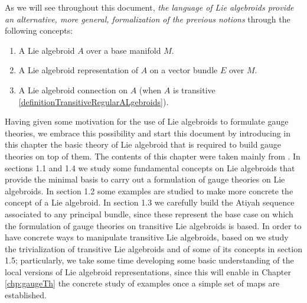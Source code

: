 As we will see throughout this document, \textit{the language of Lie algebroids provide an alternative, more general, formalization of the previous notions} through the following concepts:
\begin{enumerate}
    \item A Lie algebroid $A$ over a base manifold $M$.
    
    \item A Lie algebroid representation of $A$ on a vector bundle $E$ over $M$.
    
    \item A Lie algebroid connection on $A$ (when $A$ is transitive \ref{definitionTransitiveRegularALgebroids}).
\end{enumerate}

Having given some motivation for the use of Lie algebroids to formulate gauge theories, we embrace this possibility and start this document by introducing in this chapter the basic theory of Lie algebroid that is required to build gauge theories on top of them. The contents of this chapter were taken mainly from \cite{Mackenzie2005}. In sections 1.1 and 1.4 we study some fundamental concepts on Lie algebroids that provide the minimal basis to carry out a formulation of gauge theories on Lie algebroids. In section 1.2 some examples are studied to make more concrete the concept of a Lie algebroid. In section 1.3 we carefully build the Atiyah sequence associated to any principal bundle, since these represent the base case on which the formulation of gauge theories on transitive Lie algebroids is based. In order to have concrete ways to manipulate transitive Lie algebroids, based on \cite{Fournel2011} we study the trivialization of transitive Lie algebroids and of some of its concepts in section 1.5; particularly, we take some time developing some basic understanding of the local versions of Lie algebroid representations, since this will enable in Chapter \ref{chp:gaugeTh} the concrete study of examples once a simple set of maps are established.


    
